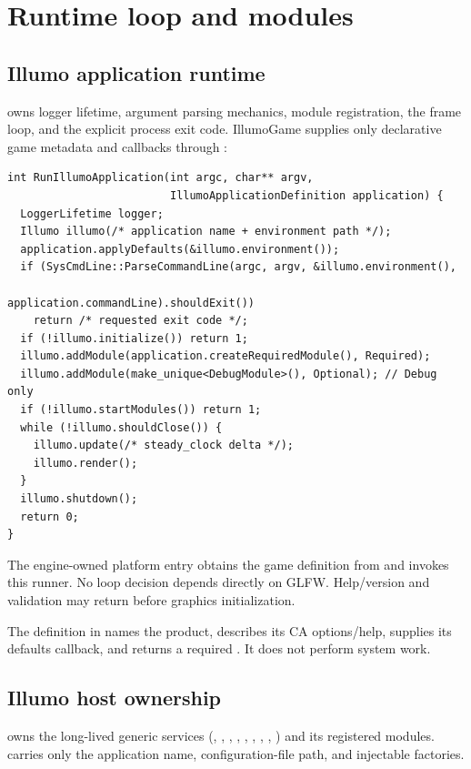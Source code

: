 \section{Runtime loop and modules}
\label{sec:runtime}

\subsection{Illumo application runtime}
 owns logger lifetime, argument
parsing mechanics, module registration, the frame loop, and the explicit
process exit code. IllumoGame supplies only declarative game metadata and
callbacks through :
\begin{lstlisting}
int RunIllumoApplication(int argc, char** argv,
                         IllumoApplicationDefinition application) {
  LoggerLifetime logger;
  Illumo illumo(/* application name + environment path */);
  application.applyDefaults(&illumo.environment());
  if (SysCmdLine::ParseCommandLine(argc, argv, &illumo.environment(),
                                   application.commandLine).shouldExit())
    return /* requested exit code */;
  if (!illumo.initialize()) return 1;
  illumo.addModule(application.createRequiredModule(), Required);
  illumo.addModule(make_unique<DebugModule>(), Optional); // Debug only
  if (!illumo.startModules()) return 1;
  while (!illumo.shouldClose()) {
    illumo.update(/* steady_clock delta */);
    illumo.render();
  }
  illumo.shutdown();
  return 0;
}
\end{lstlisting}
The engine-owned platform entry obtains the game definition from
 and invokes this runner. No loop decision
depends directly on GLFW. Help/version and validation may return before
graphics initialization.

The definition in
 names the product,
describes its CA options/help, supplies its defaults callback, and returns a
required . It does not perform system work.

\subsection{Illumo host ownership}
 owns the long-lived generic services
(, , ,
, , ,
, , ) and its
registered modules.  carries only the application name,
configuration-file path, and injectable factories.

